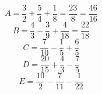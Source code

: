 \documentclass[11pt]{article}
\begin{document}
\begin{exercice}[1][Calculer]
$$A = \dfrac{3}{2} + \dfrac{5}{4} + \dfrac{1}{8} = \dfrac{23}{8}= \dfrac{46}{16}$$
$$B = \dfrac{4}{3} - \dfrac{3}{9} + \dfrac{4}{18}= \dfrac{22}{18}$$
$$C = \dfrac{7}{10} - \dfrac{1}{5} + \dfrac{6}{5} $$
$$D = \dfrac{20}{15} + \dfrac{4}{3} - \dfrac{7}{5} $$
$$E = \dfrac{10}{2} - \dfrac{7}{11} - \dfrac{1}{22} $$
\end{exercice}
\end{document}
